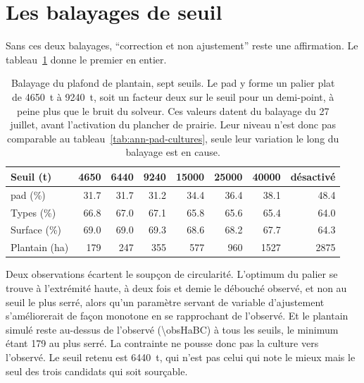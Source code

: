 \section{Les balayages de seuil}

Sans ces deux balayages, \enquote{correction et non ajustement} reste une affirmation. Le
tableau~\ref{tab:ann-balayage-plantain} donne le premier en entier.

\begin{table}[h]
  \centering
  \caption{Balayage du plafond de plantain, sept seuils. Le \gls{pad} y forme un palier plat
  de \SI{4650}{\tonne} à \SI{9240}{\tonne}, soit un facteur deux sur le seuil pour un
  demi-point, à peine plus que le bruit du solveur. Ces valeurs datent du balayage du 27
  juillet, avant l'activation du plancher de prairie. Leur niveau n'est donc pas comparable au
  tableau~\ref{tab:ann-pad-cultures}, seule leur variation le long du balayage est en cause.}
  \label{tab:ann-balayage-plantain}
  \small
  \setlength{\tabcolsep}{4pt}
  \begin{tabular}{@{}lrrrrrrr@{}}
    \toprule
    \textbf{Seuil (t)} & \num{4650} & \num{6440} & \num{9240} & \num{15000} & \num{25000}
      & \num{40000} & désactivé \\
    \midrule
    \gls{pad} (\%) & \num{31.7} & \num{31.7} & \num{31.2} & \num{34.4} & \num{36.4}
      & \num{38.1} & \num{48.4} \\
    Types (\%) & \num{66.8} & \num{67.0} & \num{67.1} & \num{65.8} & \num{65.6} & \num{65.4}
      & \num{64.0} \\
    Surface (\%) & \num{69.0} & \num{69.0} & \num{69.3} & \num{68.6} & \num{68.2} & \num{67.7}
      & \num{64.3} \\
    Plantain (ha) & \num{179} & \num{247} & \num{355} & \num{577} & \num{960} & \num{1527}
      & \num{2875} \\
    \bottomrule
  \end{tabular}
\end{table}

Deux observations écartent le soupçon de circularité. L'optimum du palier se trouve à
l'extrémité haute, à deux fois et demie le débouché observé, et non au seuil le plus serré,
alors qu'un paramètre servant de variable d'ajustement s'améliorerait de façon monotone en se
rapprochant de l'observé. Et le plantain simulé reste au-dessus de l'observé
(\SI{\obsHaBC}{\ha}) à tous les seuils, le minimum étant \SI{179}{\ha} au plus serré. La
contrainte ne pousse donc pas la culture vers l'observé. Le seuil retenu est
\SI{6440}{\tonne}, qui n'est pas celui qui note le mieux mais le seul des trois candidats qui
soit sourçable.


